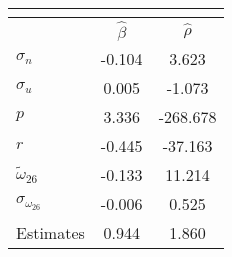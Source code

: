 \begin{tabular}{l*{2}{c}} 
\multicolumn{3}{c}{} \\ \toprule 
& $\hat{\beta}$ & $\hat{\rho}$ \\ \cmidrule(lr){2-3} 
  $\sigma_{n}$ & -0.104 & 3.623 \\ 
  $\sigma_{u}$ & 0.005 & -1.073 \\ 
  $p$ & 3.336 & -268.678 \\ 
  $r$ & -0.445 & -37.163 \\ 
  $\tilde{\omega}_{26}$ & -0.133 & 11.214 \\ 
  $\sigma_{\omega_{26}}$ & -0.006 & 0.525 \\ 
 \midrule Estimates& 0.944 & 1.860 \\ \bottomrule 
 \end{tabular}